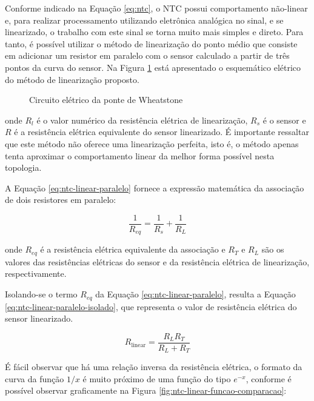 \documentclass[a4paper]{instrumentacao}
\begin{document}
Conforme indicado na Equação \ref{eq:ntc}, o NTC possui comportamento não-linear e, para realizar processamento utilizando eletrônica analógica no sinal, e se linearizado, o trabalho com este sinal se torna muito mais simples e direto. Para tanto, é possível utilizar o método de linearização do ponto médio que consiste em adicionar um resistor em paralelo com o sensor calculado a partir de três pontos da curva do sensor. Na Figura \ref{fig:ntc-linear} está apresentado o esquemático elétrico do método de linearização proposto.

\begin{figure}[H]
\center
[circuito]
\caption{Circuito elétrico da ponte de Wheatstone}
\label{fig:ntc-linear}
\end{figure}

\noindent
onde $R_l$ é o valor numérico da resistência elétrica de linearização, $R_s$ é o sensor e $R$ é a resistência elétrica equivalente do sensor linearizado. É importante ressaltar que este método não oferece uma linearização perfeita, isto é, o método apenas tenta aproximar o comportamento linear da melhor forma possível nesta topologia.

A Equação \ref{eq:ntc-linear-paralelo} fornece a expressão matemática da associação de dois resistores em paralelo:

\begin{equation}
	\frac{1}{R_{eq}}=\frac{1}{R_s} + \frac{1}{R_L}
	\label{eq:ntc-linear-paralelo}
\end{equation}

\noindent
onde $R_{eq}$ é a resistência elétrica equivalente da associação e $R_T$ e $R_L$ são os valores das resistências elétricas do sensor e da resistência elétrica de linearização, respectivamente.

Isolando-se o termo $R_{eq}$ da Equação \ref{eq:ntc-linear-paralelo}, resulta a Equação \ref{eq:ntc-linear-paralelo-isolado}, que representa o valor de resistência elétrica do sensor linearizado.

\begin{equation}
	R_{\text{linear}} = \frac{R_L R_T}{R_L+R_T}
	\label{eq:ntc-linear-paralelo-isolado}
\end{equation}

É fácil observar que há uma relação inversa da resistência elétrica, o formato da curva da função $1/x$ é muito próximo de uma função do tipo $e^{-x}$, conforme é possível observar graficamente na Figura \ref{fig:ntc-linear-funcao-comparacao}:
\end{document}
